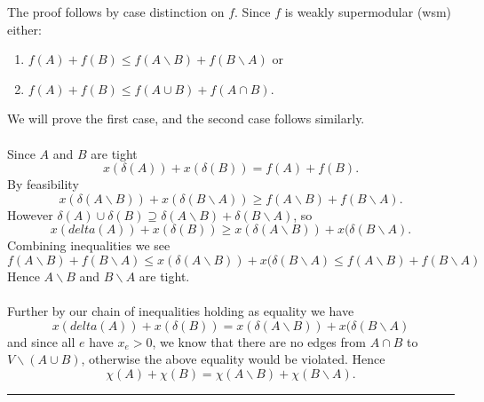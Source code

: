 \documentclass[letterpaper,12pt,oneside,onecolumn]{article}
\newenvironment{proof}{{\bf Proof:  }}{\hfill\rule{2mm}{2mm}}
\begin{document}
\begin{proof}
The proof follows by case distinction on $f$. Since $f$ is weakly supermodular (wsm) either:
\begin{enumerate}
\item $f(A) + f(B) \leq f(A\backslash B) + f(B\backslash A)$ or
\item $f(A) + f(B) \leq f(A\cup B) + f(A \cap B)$.
\end{enumerate}
We will prove the first case, and the second case follows similarly.
\paragraph{}
Since $A$ and $B$ are tight
$$x(\delta(A)) + x(\delta(B)) = f(A) + f(B).$$
By feasibility
$$x(\delta(A\backslash B)) + x(\delta(B\backslash A)) \geq f(A\backslash B) + f(B\backslash A).$$
However $\delta(A) \cup \delta(B) \supseteq \delta(A\backslash B) + \delta(B \backslash A)$, so
$$x(delta(A)) + x(\delta(B)) \geq x(\delta(A\backslash B)) + x(\delta(B\backslash A).$$
Combining inequalities we see
$$f(A\backslash B) + f(B\backslash A) \leq x(\delta(A\backslash B)) + x(\delta(B\backslash A) \leq f(A\backslash B) + f(B\backslash A) $$
Hence $A\backslash B$ and $B \backslash A$ are tight.
\paragraph{}
Further by our chain of inequalities holding as equality we have
$$x(delta(A)) + x(\delta(B)) = x(\delta(A\backslash B)) + x(\delta(B\backslash A)$$
and since all $e$ have $x_e > 0$, we know that there are no edges from $A\cap B$ to $V\backslash (A\cup B)$, otherwise the above equality would be violated. Hence
$$\chi(A) + \chi(B) = \chi(A\backslash B) + \chi(B\backslash A).$$
\end{proof}
\end{document}
